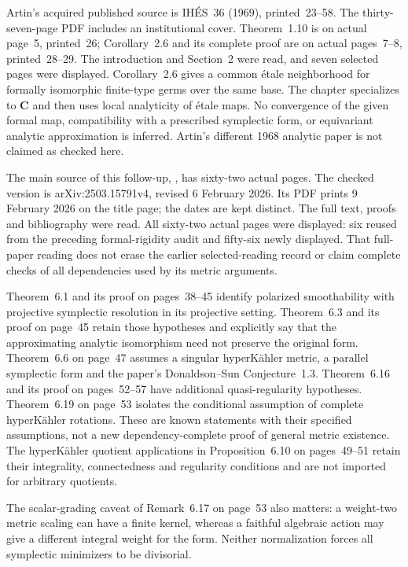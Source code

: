 Artin's acquired published source
\cite{Artin69AlgebraicApproximationPublished} is
IH\'ES~36 (1969), printed~23--58. The thirty-seven-page
PDF includes an institutional cover. Theorem~1.10
is on actual page~5, printed~26; Corollary~2.6 and
its complete proof are on actual pages~7--8,
printed~28--29. The introduction and Section~2 were
read, and seven selected pages were displayed.
Corollary~2.6 gives a common \'etale neighborhood
for formally isomorphic finite-type germs over the
same base. The chapter specializes to $\mathbf C$
and then uses local analyticity of \'etale maps.
No convergence of the given formal map, compatibility
with a prescribed symplectic form, or equivariant
analytic approximation is inferred. Artin's different
1968 analytic paper is not claimed as checked here.

The main source of this follow-up,
\cite{NamikawaOdaka26TorusV4}, has sixty-two actual pages.
The checked version is arXiv:2503.15791v4, revised
6 February 2026. Its PDF
prints 9 February 2026 on the title page; the dates
are kept distinct. The full text, proofs and
bibliography were read. All sixty-two actual pages
were displayed: six reused from the preceding
formal-rigidity audit and fifty-six newly displayed.
That full-paper reading does not erase the earlier
selected-reading record or claim complete checks of
all dependencies used by its metric arguments.

Theorem~6.1 and its proof on pages~38--45 identify
polarized smoothability with projective symplectic
resolution in its projective setting. Theorem~6.3
and its proof on page~45 retain those hypotheses
and explicitly say that the approximating analytic
isomorphism need not preserve the original form.
Theorem~6.6 on page~47 assumes a singular
hyperK\"ahler metric, a parallel symplectic form
and the paper's Donaldson--Sun Conjecture~1.3.
Theorem~6.16 and its proof on pages~52--57 have
additional quasi-regularity hypotheses. Theorem~6.19
on page~53 isolates the conditional assumption of
complete hyperK\"ahler rotations. These are known
statements with their specified assumptions, not a
new dependency-complete proof of general metric
existence. The hyperK\"ahler quotient applications
in Proposition~6.10 on pages~49--51 retain their
integrality, connectedness and regularity conditions
and are not imported for arbitrary quotients.

The scalar-grading caveat of Remark~6.17 on
page~53 also matters: a weight-two metric scaling
can have a finite kernel, whereas a faithful
algebraic action may give a different integral
weight for the form. Neither normalization forces
all symplectic minimizers to be divisorial.

